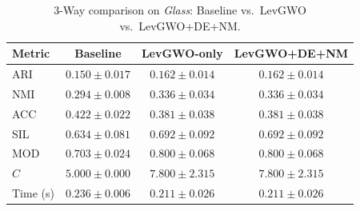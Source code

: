 \begin{table}[htbp]
\centering
\caption{3-Way comparison on \textit{Glass}: Baseline vs.\ LevGWO vs.\ LevGWO+DE+NM.}
\label{tab:glass_3way}
\begin{tabular}{lccc}
\toprule
Metric & Baseline & LevGWO-only & LevGWO+DE+NM \\
\midrule
ARI & $0.150 \pm 0.017$ & $\mathbf{0.162 \pm 0.014}$ & $\mathbf{0.162 \pm 0.014}$ \\
NMI & $0.294 \pm 0.008$ & $\mathbf{0.336 \pm 0.034}$ & $\mathbf{0.336 \pm 0.034}$ \\
ACC & $\mathbf{0.422 \pm 0.022}$ & $0.381 \pm 0.038$ & $0.381 \pm 0.038$ \\
SIL & $0.634 \pm 0.081$ & $\mathbf{0.692 \pm 0.092}$ & $\mathbf{0.692 \pm 0.092}$ \\
MOD & $0.703 \pm 0.024$ & $\mathbf{0.800 \pm 0.068}$ & $\mathbf{0.800 \pm 0.068}$ \\
$C$ & $5.000 \pm 0.000$ & $7.800 \pm 2.315$ & $7.800 \pm 2.315$ \\
Time (s) & $0.236 \pm 0.006$ & $0.211 \pm 0.026$ & $0.211 \pm 0.026$ \\
\bottomrule
\end{tabular}
\end{table}